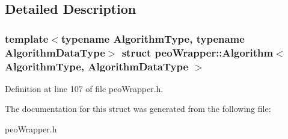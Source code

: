 \subsection{Detailed Description}
\subsubsection*{template$<$typename Algorithm\-Type, typename Algorithm\-Data\-Type$>$ struct peo\-Wrapper::Algorithm$<$ Algorithm\-Type, Algorithm\-Data\-Type $>$}





Definition at line 107 of file peo\-Wrapper.h.

The documentation for this struct was generated from the following file:\begin{CompactItemize}
\item 
peo\-Wrapper.h\end{CompactItemize}
